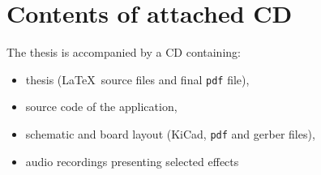 \documentclass[a4paper,twoside,12pt]{book}
\begin{document}
\chapter*{Contents of attached CD}

The thesis is accompanied by a CD containing:
\begin{itemize}
\item thesis (\LaTeX\ source files and final \texttt{pdf} file),
\item source code of the application,
\item schematic and board layout (KiCad, \texttt{pdf} and gerber files),
\item audio recordings presenting selected effects
\end{itemize}


\end{document}
